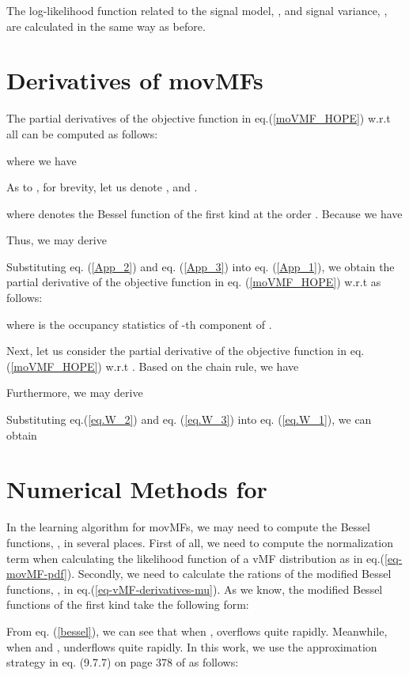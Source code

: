 \documentclass[11pt]{article}
\begin{document}
The log-likelihood function related to the signal model, , and signal variance, , are calculated in the same way as before.

\section{Derivatives of movMFs}
\label{appendix_derivatives_movMF}

The partial derivatives of the objective function in eq.(\ref{moVMF_HOPE}) w.r.t  all  can be computed as follows:

where we have  

As to , for brevity, let us denote , and .

where  denotes the Bessel function of the first kind at the order . Because we have

Thus, we may derive  


Substituting  eq. (\ref{App_2}) and eq. (\ref{App_3}) into  eq. (\ref{App_1}),  we obtain the partial derivative of the objective function in eq. (\ref{moVMF_HOPE}) w.r.t   as follows:

where  
 is the occupancy statistics of -th component of .

Next, let us consider the
partial derivative of the objective function in eq.(\ref{moVMF_HOPE}) w.r.t  .
Based on the chain rule, we have 


Furthermore, we may derive



Substituting  eq.(\ref{eq.W_2}) and eq. (\ref{eq.W_3}) into  eq. (\ref{eq.W_1}),  we can obtain


\section{Numerical Methods for }
\label{appendix-numerical-Bessel}

In the learning algorithm for movMFs, we may need to compute the Bessel functions, , in several places. 
First of all, we need to compute the normalization term  when calculating the likelihood function of a vMF distribution as in eq.(\ref{eq-movMF-pdf}). Secondly, we need to calculate the rations of the modified Bessel functions, , in eq.(\ref{eq-vMF-derivatives-mu}).
As we know, the modified Bessel functions of the first kind take the following form:
 

From eq. (\ref{bessel}), we can see that when ,  overflows quite rapidly. Meanwhile,  
when  and ,  underflows quite rapidly. In this work,
 we use the approximation strategy in eq. (9.7.7) on page 378 of \cite{Abramowitz_1964} as follows:
\end{document}
